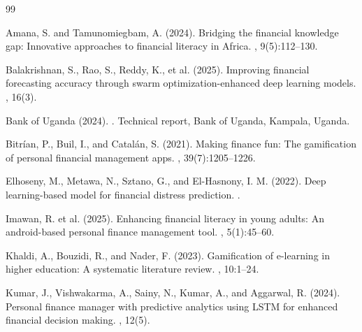 \documentclass[12pt,a4paper]{report}
\begin{document}


\begin{thebibliography}{99}

Amana, S. and Tamunomiegbam, A. (2024).
\newblock Bridging the financial knowledge gap: Innovative approaches to financial literacy in Africa.
, 9(5):112--130.

Balakrishnan, S., Rao, S., Reddy, K., et al. (2025).
\newblock Improving financial forecasting accuracy through swarm optimization-enhanced deep learning models.
, 16(3).

Bank of Uganda (2024).
.
\newblock Technical report, Bank of Uganda, Kampala, Uganda.

Bitr\'{i}an, P., Buil, I., and Catal\'{a}n, S. (2021).
\newblock Making finance fun: The gamification of personal financial management apps.
, 39(7):1205--1226.

Elhoseny, M., Metawa, N., Sztano, G., and El-Hasnony, I. M. (2022).
\newblock Deep learning-based model for financial distress prediction.
.

Imawan, R. et al. (2025).
\newblock Enhancing financial literacy in young adults: An android-based personal finance management tool.
, 5(1):45--60.

Khaldi, A., Bouzidi, R., and Nader, F. (2023).
\newblock Gamification of e-learning in higher education: A systematic literature review.
, 10:1--24.

Kumar, J., Vishwakarma, A., Sainy, N., Kumar, A., and Aggarwal, R. (2024).
\newblock Personal finance manager with predictive analytics using LSTM for enhanced financial decision making.
, 12(5).


\end{thebibliography}
\end{document}
